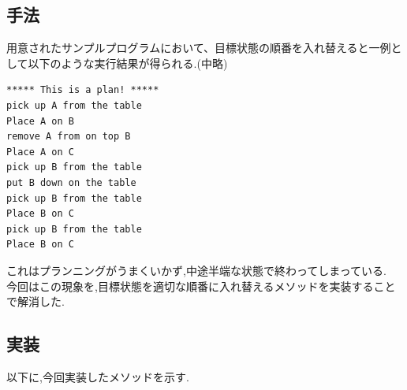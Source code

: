 \documentclass[uplatex,12pt]{jsarticle}
\begin{document}
\subsection{手法}
用意されたサンプルプログラムにおいて、目標状態の順番を入れ替えると一例として以下のような実行結果が得られる.(中略)
\begin{lstlisting}[caption=正しくない動作例, label=mid]
***** This is a plan! *****
pick up A from the table
Place A on B
remove A from on top B
Place A on C
pick up B from the table
put B down on the table
pick up B from the table
Place B on C
pick up B from the table
Place B on C
\end{lstlisting}
​
これはプランニングがうまくいかず,中途半端な状態で終わってしまっている.\\
今回はこの現象を,目標状態を適切な順番に入れ替えるメソッドを実装することで解消した.

\subsection{実装}
以下に,今回実装したメソッドを示す.\\
\end{document}
